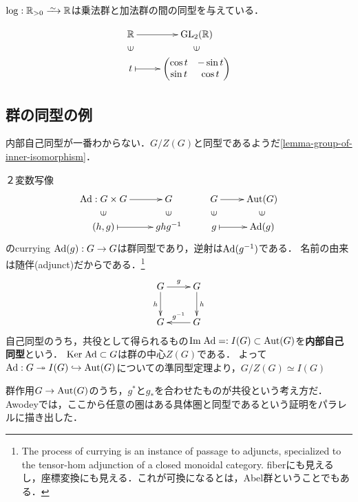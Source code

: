 \documentclass[uplatex,dvipdfmx]{jsreport}
\begin{document}
\begin{example}[対数という群準同型]
    $\log:\R_{>0}\iso\R$は乗法群と加法群の間の同型を与えている．
\end{example}

\begin{example}[回転という群準同型]
    \[\xymatrix@R-2pc{
        \R\ar[r]&\GL_2(\R)\\
        \rotatebox[origin=c]{90}{$\in$}&\rotatebox[origin=c]{90}{$\in$}\\
        t\ar@{|->}[r]&{\begin{pmatrix}\cos t&-\sin t\\\sin t&\cos t\end{pmatrix}}
    }\]
\end{example}

\subsection{群の同型の例}

\begin{tcolorbox}[colframe=ForestGreen, colback=ForestGreen!10!white,breakable,colbacktitle=ForestGreen!40!white,coltitle=black,fonttitle=\bfseries\sffamily,
title=]
    内部自己同型が一番わからない．$G/Z(G)$と同型であるようだ\ref{lemma-group-of-inner-isomorphism}．
\end{tcolorbox}

\begin{example}
    ２変数写像
    \[\xymatrix@R-2pc{
        \Ad:G\times G\ar[r]&G&G\ar[r]&\Aut(G)\\
        \rotatebox[origin=c]{90}{$\in$}&\rotatebox[origin=c]{90}{$\in$}&\rotatebox[origin=c]{90}{$\in$}&\rotatebox[origin=c]{90}{$\in$}\\
        (h,g)\ar@{|->}[r]&ghg^{-1}&g\ar@{|->}[r]&\Ad(g)
    }\]
    のcurrying $\mathrm{Ad}(g):G\to G$は群同型であり，逆射は$\mathrm{Ad}(g^{-1})$である．
    名前の由来は随伴(adjunct)だからである．\footnote{The process of currying is an instance of passage to adjuncts, specialized to the tensor-hom adjunction of a closed monoidal category. fiberにも見えるし，座標変換にも見える．これが可換になるとは，Abel群ということでもある．}
    \[\xymatrix{
        G\ar[r]^-g\ar[d]_-h&G\ar[d]^-{h}\\
        G&G\ar[l]_-{g^{-1}}
    }\]
    自己同型のうち，共役として得られるもの$\mathrm{Im}\;\mathrm{Ad}=:I(G)\subset\mathrm{Aut}(G)$を\textbf{内部自己同型}という．
    $\mathrm{Ker}\;\mathrm{Ad}\subset G$は群の中心$Z(G)$である．
    よって$\mathrm{Ad}:G\twoheadrightarrow I(G)\hookrightarrow\mathrm{Aut}(G)$についての準同型定理より，$G/Z(G)\simeq I(G)$
\end{example}
\begin{remarks}
    群作用$G\to\mathrm{Aut}(G)$のうち，$g^*$と$g_*$を合わせたものが共役という考え方だ．
    Awodeyでは，ここから任意の圏はある具体圏と同型であるという証明をパラレルに描き出した．
\end{remarks}
\end{document}
